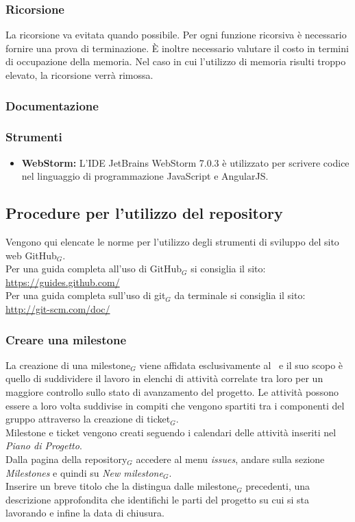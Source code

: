 \subsubsection{Ricorsione}
La ricorsione va evitata quando possibile. Per ogni funzione ricorsiva è necessario
fornire una prova di terminazione. È inoltre necessario valutare il costo in termini di
occupazione della memoria. Nel caso in cui l’utilizzo di memoria risulti troppo elevato, la ricorsione verrà rimossa.

\subsubsection{Documentazione}

\subsubsection{Strumenti}
\begin{itemize}

	\item \textbf{WebStorm:} L’IDE JetBrains WebStorm 7.0.3 è utilizzato per scrivere codice nel linguaggio di programmazione JavaScript e AngularJS.
\end{itemize}


\subsection{Procedure per l'utilizzo del repository} \label{procedureticket}
Vengono qui elencate le norme per l'utilizzo degli strumenti di sviluppo del sito web GitHub$_G$. \\
Per una guida completa all'uso di GitHub$_G$ si consiglia il sito: \\
\url{https://guides.github.com/}\\
Per una guida completa sull'uso di git$_G$ da terminale si consiglia il sito: \\
\url{http://git-scm.com/doc/}

\subsubsection{Creare una milestone}
La creazione di una milestone$_G$ viene affidata esclusivamente al \ruoloResponsabile\ e il suo scopo è quello di suddividere il lavoro in elenchi di attività correlate tra loro per un maggiore controllo sullo stato di avanzamento del progetto. Le attività possono essere a loro volta suddivise in compiti che vengono spartiti tra i componenti del gruppo attraverso la creazione di ticket$_G$. \\
Milestone e ticket vengono creati seguendo i calendari delle attività inseriti nel \textit{Piano di Progetto}. \\
    Dalla pagina della repository$_G$ accedere al menu \textit{issues}, andare sulla sezione \textit{Milestones} e quindi su \textit{New milestone$_G$}.\\
    Inserire un breve titolo che la distingua dalle milestone$_G$ precedenti, una descrizione approfondita che identifichi le parti del progetto su cui si sta lavorando e infine la data di chiusura.

